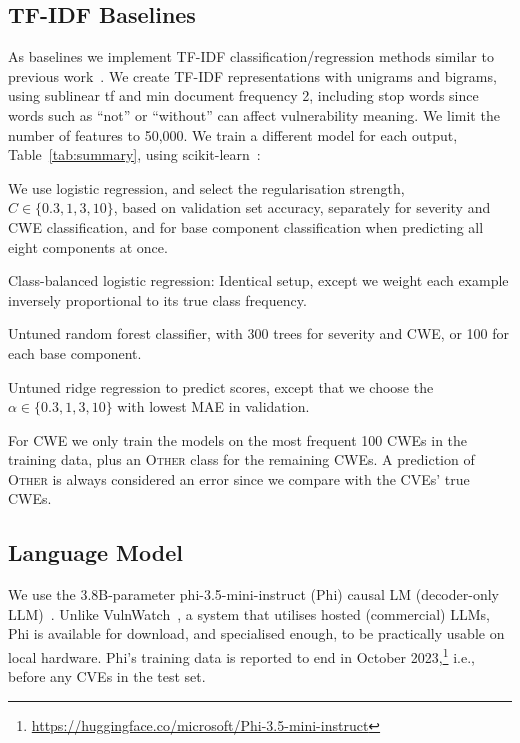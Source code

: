 \FloatBarrier
\subsection{TF-IDF Baselines}
As baselines we implement TF-IDF classification/regression methods similar to previous work~\citep{elbaz2020fighting}.
We create TF-IDF representations with unigrams and bigrams, using sublinear tf and min document frequency 2, including stop words since words such as ``not'' or ``without'' can affect vulnerability meaning.
We limit the number of features to 50,000.
We train a different model for each output, Table~\ref{tab:summary}, using scikit-learn~\citep{pedregosa2011sklearn}:
\begin{description}\sloppy
  \item[LogReg] We use logistic regression, and select the regularisation strength, $C \in \{0.3, 1, 3, 10\}$, based on validation set accuracy, separately for severity and CWE classification, and for base component classification when predicting all eight components at once.
  \item[CB-LogReg] Class-balanced logistic regression: Identical setup, except we weight each example inversely proportional to its true class frequency.
  \item[Rand.\ Forest] Untuned random forest classifier, with 300 trees for severity and CWE, or 100 for each base component.
  \item[Ridge] Untuned ridge regression to predict scores, except that we choose the $\alpha \in \{0.3, 1, 3, 10\}$ with lowest MAE in validation.
\end{description}
For CWE we only train the models on the most frequent 100 CWEs in the training data, plus an \textsc{Other} class for the remaining CWEs.
A prediction of \textsc{Other} is always considered an error since we compare with the CVEs' true CWEs.

\FloatBarrier
\subsection{Language Model}
We use the 3.8B-parameter phi-3.5-mini-instruct (Phi) causal LM (decoder-only LLM)~\citep{abdin2024phi3}.
Unlike VulnWatch~\citep{databricks2025vulnwatch}, a system that utilises hosted (commercial) LLMs, Phi is available for download, and specialised enough, to be practically usable on local hardware.
Phi's training data is reported to end in October 2023,\footnote{\url{https://huggingface.co/microsoft/Phi-3.5-mini-instruct}} i.e., before any CVEs in the test set.

